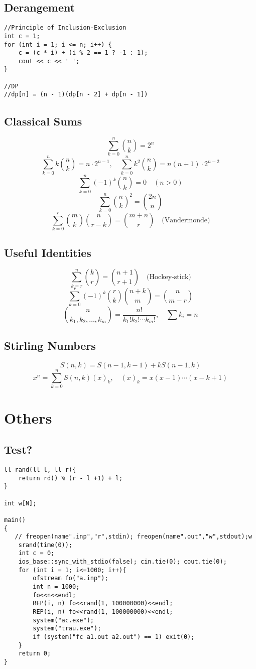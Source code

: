 \documentclass[11pt,a4paper]{article}
\begin{document}
\begin{multicols*}{2}
\subsection{Derangement}
\begin{lstlisting}
//Principle of Inclusion-Exclusion
int c = 1;
for (int i = 1; i <= n; i++) {
    c = (c * i) + (i % 2 == 1 ? -1 : 1);
    cout << c << ' ';
}

//DP
//dp[n] = (n - 1)(dp[n - 2] + dp[n - 1])
\end{lstlisting}

\subsection{Classical Sums}
\[
\sum_{k=0}^n \binom{n}{k} = 2^n
\]
\[
\sum_{k=0}^n k \binom{n}{k} = n \cdot 2^{n-1}, 
\quad
\sum_{k=0}^n k^2 \binom{n}{k} = n(n+1) \cdot 2^{n-2}
\]
\[
\sum_{k=0}^n (-1)^k \binom{n}{k} = 0 \quad (n>0)
\]
\[
\sum_{k=0}^n \binom{n}{k}^2 = \binom{2n}{n}
\]
\[
\sum_{k=0}^r \binom{m}{k}\binom{n}{r-k} = \binom{m+n}{r} \quad \text{(Vandermonde)}
\]

\subsection{Useful Identities}
\[
\sum_{k=r}^n \binom{k}{r} = \binom{n+1}{r+1}
\quad \text{(Hockey-stick)}
\]
\[
\sum_{k=0}^r (-1)^k \binom{r}{k}\binom{n+k}{m} = \binom{n}{m-r}
\]
\[
\binom{n}{k_1, k_2, \dots, k_m} = \frac{n!}{k_1! k_2! \cdots k_m!}, 
\quad \sum k_i = n
\]

\subsection{Stirling Numbers}
\[
S(n,k) = S(n-1,k-1) + k S(n-1,k)
\]
\[
x^n = \sum_{k=0}^n S(n,k)(x)_k, \quad (x)_k = x(x-1)\cdots(x-k+1)
\]

\section{Others}
\subsection{Test?}
\begin{lstlisting}
ll rand(ll l, ll r){
    return rd() % (r - l +1) + l;
}

int w[N];

main()
{
   // freopen(name".inp","r",stdin); freopen(name".out","w",stdout);w
    srand(time(0));
    int c = 0;
    ios_base::sync_with_stdio(false); cin.tie(0); cout.tie(0);
    for (int i = 1; i<=1000; i++){
        ofstream fo("a.inp");
        int n = 1000;
        fo<<n<<endl;
        REP(i, n) fo<<rand(1, 100000000)<<endl;
        REP(i, n) fo<<rand(1, 100000000)<<endl;
        system("ac.exe");
        system("trau.exe");
        if (system("fc a1.out a2.out") == 1) exit(0);
    }
    return 0;
}


\end{lstlisting}
\end{multicols*}
\end{document}

